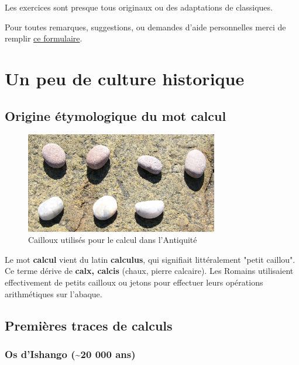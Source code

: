 \documentclass[11pt]{article}
\begin{document}
Les exercices sont presque tous originaux ou des adaptations de classiques.

\newpage

Pour toutes remarques, suggestions, ou demandes d'aide personnelles
merci de remplir \href{https://forms.gle/x7fAce7GqiJAGbsC7}{ce formulaire}.


\newpage

\section{Un peu de culture historique}
\label{sec:org75c9f53}
\subsection{Origine étymologique du mot calcul}
\label{sec:orgd9a48b2}

\begin{figure}[htbp]
\centering
\includegraphics[width=0.75\textwidth]{./images/Cailloux.jpeg}
\caption{Cailloux utilisés pour le calcul dans l'Antiquité}
\end{figure}



Le mot \textbf{calcul} vient du latin \textbf{calculus}, qui signifiait littéralement "petit caillou".
Ce terme dérive de \textbf{calx, calcis} (chaux, pierre calcaire).
Les Romains utilisaient effectivement de petits cailloux ou jetons pour effectuer leurs opérations arithmétiques sur l'abaque.

\newpage

\subsection{Premières traces de calculs}
\label{sec:org2012972}

\subsubsection{Os d'Ishango (\textasciitilde{}20 000 ans)}
\label{sec:orgb2c2681}
\end{document}
